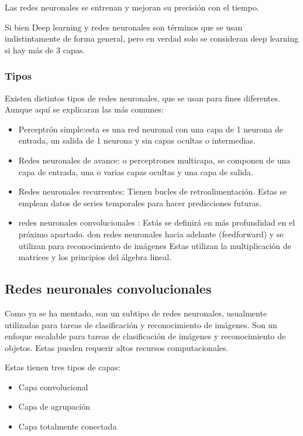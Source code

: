 Las redes neuronales se entrenan y mejoran su precisión con el tiempo.

Si bien Deep learning y redes neuronales son términos que se usan indistintamente de forma general, pero en verdad solo se consideran deep learning si hay más de 3 capas.

\subsubsection{Tipos}
Existen distintos tipos de redes neuronales, que se usan para fines diferentes. Aunque aquí se explicaran las más comunes:

\begin{itemize}
	\item{Perceptrón simple}:esta es una red neuronal con una capa de 1 neurona de entrada, un salida de 1 neurona y sin capas ocultas o intermedias.
	
	\item{Redes neuronales de avance}: o perceptrones multicapa, se componen de una capa de entrada, una o varias capas ocultas y una capa de salida.
	
	\item{Redes neuronales recurrentes}: Tienen bucles de retroalimentación. Estas se emplean datos de series temporales para hacer predicciones futuras.
	
	\item{redes neuronales convolucionales}	: Estás se definirá en más profundidad en el próximo apartado. don redes neuronales hacia adelante (feedforward) y se utilizan para reconocimiento de imágenes Estas utilizan la multiplicación de matrices y los principios del álgebra lineal.
\end{itemize}

\subsection{Redes neuronales convolucionales}\label{sect:redesConvolucionales}
Como ya se ha mentado, son un subtipo de redes neuronales\cite{ibmQuRedes}, usualmente utilizadas para tareas de clasificación y reconocimiento de imágenes. Son un enfoque escalable para tareas de clasificación de imágenes y reconocimiento de objetos. Estas pueden requerir altos recursos computacionales.

Estas tienen tres tipos de capas:
\begin{itemize}
	\item{Capa convolucional}
	
	\item{Capa de agrupación}
	
	\item{Capa totalmente conectada}	
\end{itemize}

